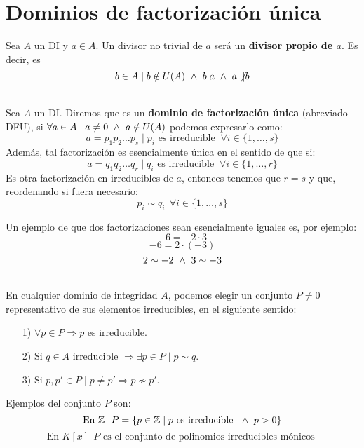 \chapter{Dominios de factorización única}
\begin{definicion}
    Sea $A$ un DI y $a \in A$. Un divisor no trivial de $a$ será un \textbf{divisor propio de $a$}. Es decir, es
    $$b \in A \mid b \notin U(A) \ \land \  b|a \ \land \  a\not|b$$
\end{definicion}

\begin{definicion}
    \ \\
    Sea $A$ un DI. Diremos que es un \textbf{dominio de factorización única} $($abreviado DFU$)$, si $\forall a \in A \mid a \neq 0 \ \land \ 
        a \notin U(A)$ podemos expresarlo como:
    $$a=p_1p_2\ldots p_s \mid p_i \mbox{ es irreducible } ~\forall i \in \{1, \ldots, s\}$$
    Además, tal factorización es esencialmente única en el sentido de que si:
    $$a=q_1q_2\ldots q_r \mid q_i \mbox{ es irreducible } ~\forall i \in \{1, \ldots, r\}$$
    Es otra factorización en irreducibles de $a$, entonces tenemos que $r=s$ y que, reordenando si fuera necesario:
    $$p_i \sim q_i~~\forall i \in \{1, \ldots, s\}$$
\end{definicion}

\begin{ejemplo}
    Un ejemplo de que dos factorizaciones sean esencialmente iguales es, por ejemplo:
    $$-6 = -2 \cdot 3$$
    $$-6 = 2 \cdot (-3)$$
    $$2\sim -2 \ \land \  3 \sim -3$$
\end{ejemplo}~\\

En cualquier dominio de integridad $A$, podemos elegir un conjunto $P \neq 0$ representativo de sus elementos irreducibles,
en el siguiente sentido:
\begin{enumerate}
    \item[1)] $\forall p \in P \Rightarrow p$ es irreducible.
    \item[2)] Si $q\in A$ irreducible $\Rightarrow \exists p \in P \mid p\sim q$.
    \item[3)] Si $p,p'\in P \mid p\neq p' \Rightarrow p\not\sim p'$.
\end{enumerate}
\begin{ejemplo}
    Ejemplos del conjunto $P$ son:
    $$\mbox{En } \mathbb Z~~P=\{p \in \mathbb Z \mid p \mbox{ es irreducible } \ \land \  p > 0\}$$
    $$\mbox{En } K[x]~~P \mbox{ es el conjunto de polinomios irreducibles mónicos }$$
\end{ejemplo}

